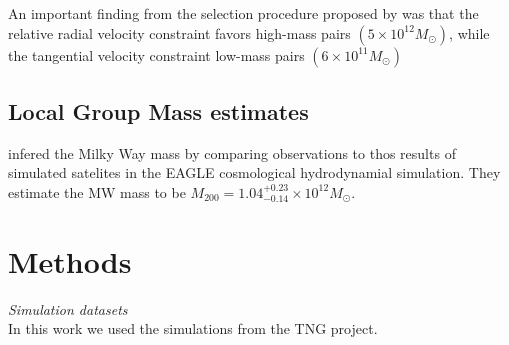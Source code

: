 \documentclass[fleqn,usenatbib]{mnras}
\begin{document}
An important finding from the selection procedure proposed by \cite{fattahi2016apostle} was that the relative radial velocity constraint favors high-mass pairs $(5\times 10^{12} M_\odot)$, while the tangential velocity constraint low-mass pairs $(6\times 10^{11} M_\odot)$







\subsection{Local Group Mass estimates}

\citep{2018arXiv180810456C} infered the Milky Way mass by comparing
observations to thos results of simulated satelites in the EAGLE
cosmological hydrodynamial simulation. 
They estimate the MW mass to be $M_{200} =
1.04_{-0.14}^{+0.23}\times10^{12}M_{\odot}$. 
\section{Methods}
\textit{Simulation datasets}\\
In this work we used the simulations from the TNG project.
\end{document}
